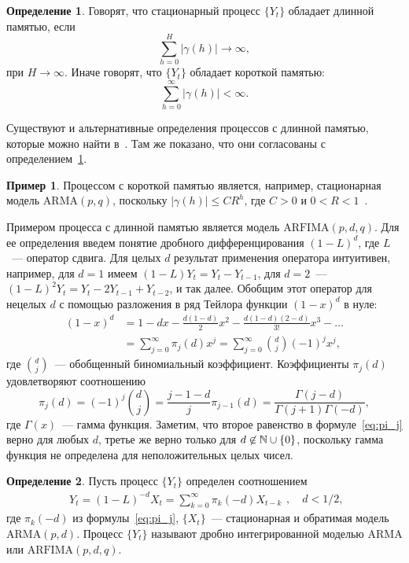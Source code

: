 \documentclass[specialist,
substylefile = spbu_report.rtx,
subf,12pt]{disser}
\theoremstyle{definition}
\newtheorem{definition}{Определение}[chapter]
\newtheorem{example}{Пример}[chapter]
\begin{document}
\begin{definition}\label{def:longmemory}
	Говорят, что стационарный процесс $\{Y_t\}$ обладает длинной памятью, если
	\[
		\sum_{h=0}^H|\gamma(h)|\to\infty,
	\]
	при $H\to\infty$. Иначе говорят, что $\{Y_t\}$ обладает короткой памятью:
	\[
		\sum_{h=0}^\infty|\gamma(h)|<\infty.
	\]
\end{definition}
Существуют и альтернативные определения процессов с длинной памятью, которые можно найти в~\cite[Раздел 3.1]{Palma2006}. Там же показано, что они согласованы с определением~\ref{def:longmemory}.
\begin{example}
	Процессом с короткой памятью является, например, стационарная модель $\mathrm{ARMA}(p, q)$, поскольку $|\gamma(h)|\leqslant CR^h$, где $C>0$ и $0<R<1$~\cite[Section 10.4]{BoxJenkins2016}.
\end{example}
Примером процесса с длинной памятью является модель $\textrm{ARFIMA}(p, d, q)$. Для ее определения введем понятие дробного дифференцирования $(1-L)^d$, где $L$~--- оператор сдвига. Для целых $d$ результат применения оператора интуитивен, например, для $d=1$ имеем $(1-L)Y_t=Y_t-Y_{t-1}$, для $d=2$~--- $(1-L)^2Y_t=Y_t-2Y_{t-1}+Y_{t-2}$, и так далее. Обобщим этот оператор для нецелых $d$ с помощью разложения в ряд Тейлора функции $(1-x)^d$ в нуле:
\[
	\begin{aligned}
		(1-x)^d & =1-dx-\frac{d(1-d)}{2}x^2-\frac{d(1-d)(2-d)}{3!}x^3-\ldots             \\
		        & =\sum_{j=0}^\infty \pi_j(d)x^j=\sum_{j=0}^\infty\binom{d}{j}(-1)^jx^j,
	\end{aligned}
\]
где $\binom{d}{j}$~--- обобщенный биномиальный коэффициент. Коэффициенты $\pi_j(d)$ удовлетворяют соотношению
\begin{equation}\label{eq:pi_j}
	\pi_j(d)=(-1)^j\binom{d}{j}=\frac{j-1-d}{j}\pi_{j-1}(d)=\frac{\Gamma(j-d)}{\Gamma(j+1)\Gamma(-d)},
\end{equation}
где $\Gamma(x)$~--- гамма функция. Заметим, что второе равенство в формуле~\eqref{eq:pi_j} верно для любых $d$, третье же верно только для $d\not\in\mathbb{N}\cup\{0\}$, поскольку гамма функция не определена для неположительных целых чисел.
\begin{definition}\label{def:arfima}
	Пусть процесс $\{Y_t\}$ определен соотношением
	\[
		\begin{aligned}
			Y_t=(1-L)^{-d}X_t=\sum_{k=0}^\infty \pi_k(-d)X_{t-k}
		\end{aligned},\quad d<1/2,
	\]
	где $\pi_k(-d)$ из формулы~\eqref{eq:pi_j}, $\{X_t\}$~--- стационарная и обратимая модель $\mathrm{ARMA}(p, d)$. Процесс $\{Y_t\}$ называют дробно интегрированной моделью $\mathrm{ARMA}$ или $\textrm{ARFIMA}(p, d, q)$.
\end{definition}
\end{document}
